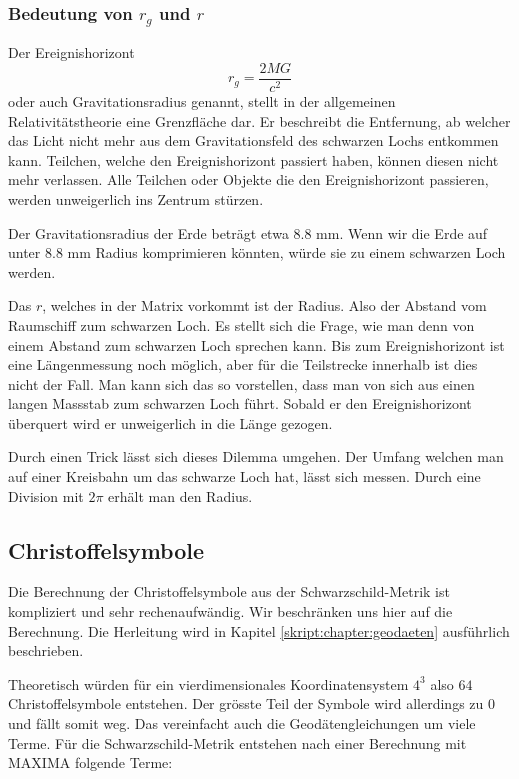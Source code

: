 \begin{refsection}
	\subsubsection{Bedeutung von $r_{g}$ und $r$}
 	Der Ereignishorizont 
     \begin{equation} \label{Gravitationsradius}
     r_{g}= \frac{2MG}{c^2}
     \end{equation}
     oder auch Gravitationsradius genannt, stellt in der allgemeinen Relativitätstheorie eine Grenzfläche dar. Er beschreibt die Entfernung, ab welcher das Licht nicht mehr aus dem Gravitationsfeld des schwarzen Lochs entkommen kann. Teilchen, welche den Ereignishorizont passiert haben, können diesen nicht mehr verlassen. Alle Teilchen oder Objekte die den Ereignishorizont passieren, werden unweigerlich ins Zentrum stürzen. 
	
	Der Gravitationsradius der Erde beträgt etwa 8.8 mm. Wenn wir die Erde auf unter 8.8 mm Radius komprimieren könnten, würde sie zu einem schwarzen Loch werden.
    
    Das $r$, welches in der Matrix vorkommt ist der Radius. Also der Abstand vom Raumschiff zum schwarzen Loch. Es stellt sich die Frage, wie man denn von einem Abstand zum schwarzen Loch sprechen kann. Bis zum Ereignishorizont ist eine Längenmessung noch möglich, aber für die Teilstrecke innerhalb ist dies nicht der Fall. Man kann sich das so vorstellen, dass man von sich aus einen langen Massstab zum schwarzen Loch führt. Sobald er den Ereignishorizont überquert wird er unweigerlich in die Länge gezogen.
    
    Durch einen Trick lässt sich dieses Dilemma umgehen. Der Umfang welchen man auf einer Kreisbahn um das schwarze Loch hat, lässt sich messen. Durch eine Division mit $2\pi$ erhält man den Radius.
	
	\subsection{Christoffelsymbole}\label{skript:chapter:zeitreisen:christoffel}
	
	Die Berechnung der Christoffelsymbole aus der Schwarzschild-Metrik ist kompliziert und sehr rechenaufwändig. Wir beschränken uns hier auf die Berechnung. Die Herleitung wird in Kapitel \ref{skript:chapter:geodaeten} ausführlich beschrieben. 
	
	Theoretisch würden für ein vierdimensionales Koordinatensystem $4^{3}$ also $64$ Christoffelsymbole entstehen. Der grösste Teil der Symbole wird allerdings zu $0$ und fällt somit weg. Das vereinfacht auch die Geodätengleichungen um viele Terme. 
	Für die Schwarzschild-Metrik entstehen nach einer Berechnung mit MAXIMA folgende Terme:
	

\end{refsection}
